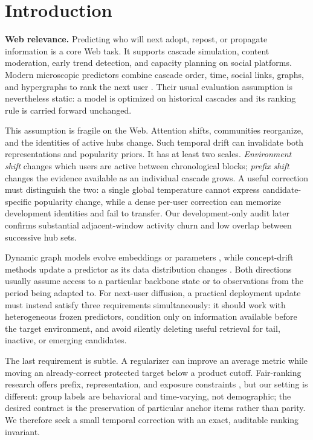 \documentclass[sigconf,anonymous,review]{acmart}
\begin{document}
\maketitle

\section{Introduction}
\textbf{Web relevance.} Predicting who will next adopt, repost, or propagate information is a core Web task. It supports cascade simulation, content moderation, early trend detection, and capacity planning on social platforms. Modern microscopic predictors combine cascade order, time, social links, graphs, and hypergraphs to rank the next user \cite{li2017deepcas,wang2017topolstm,yuan2020dyhgcn,sun2022mshgat,cheng2023disenidp}. Their usual evaluation assumption is nevertheless static: a model is optimized on historical cascades and its ranking rule is carried forward unchanged.

This assumption is fragile on the Web. Attention shifts, communities reorganize, and the identities of active hubs change. Such temporal drift can invalidate both representations and popularity priors. It has at least two scales. \emph{Environment shift} changes which users are active between chronological blocks; \emph{prefix shift} changes the evidence available as an individual cascade grows. A useful correction must distinguish the two: a single global temperature cannot express candidate-specific popularity change, while a dense per-user correction can memorize development identities and fail to transfer. Our development-only audit later confirms substantial adjacent-window activity churn and low overlap between successive hub sets.

Dynamic graph models evolve embeddings or parameters \cite{pareja2020evolvegcn,kumar2019jodie,trivedi2019dyrep,xu2020tgat}, while concept-drift methods update a predictor as its data distribution changes \cite{gama2014survey,webb2016drift}. Both directions usually assume access to a particular backbone state or to observations from the period being adapted to. For next-user diffusion, a practical deployment update must instead satisfy three requirements simultaneously: it should work with heterogeneous frozen predictors, condition only on information available before the target environment, and avoid silently deleting useful retrieval for tail, inactive, or emerging candidates.

The last requirement is subtle. A regularizer can improve an average metric while moving an already-correct protected target below a product cutoff. Fair-ranking research offers prefix, representation, and exposure constraints \cite{zehlike2017fair,celis2018ranking,biega2018equity,singh2018exposure}, but our setting is different: group labels are behavioral and time-varying, not demographic; the desired contract is the preservation of particular anchor items rather than parity. We therefore seek a small temporal correction with an exact, auditable ranking invariant.
\end{document}
